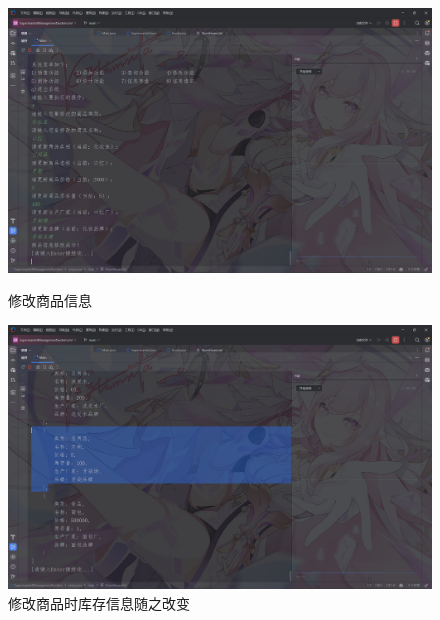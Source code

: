 \documentclass[12pt, a4paper, oneside]{ctexart}
\begin{document}
\begin{figure}[H]
    \begin{minipage}[t]{0.48\textwidth}
        \includegraphics[width=\textwidth]{../images/修改商品信息.png}
        \caption{修改商品信息}
    \end{minipage}
    \hfill
    \begin{minipage}[t]{0.48\textwidth}
        \includegraphics[width=\textwidth]{../images/修改商品时库存信息随之改变.png}
        \caption{修改商品时库存信息随之改变}
    \end{minipage}
\end{figure}
\end{document}
